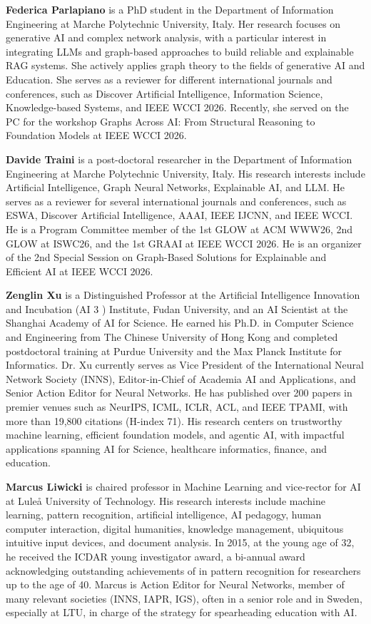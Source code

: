 \documentclass{article}
\begin{document}
\smallskip
\noindent
\textbf{Federica Parlapiano} is a PhD student in the Department of Information Engineering at Marche Polytechnic University, Italy. Her research focuses on generative AI and complex network analysis, with a particular interest in integrating LLMs and graph-based approaches to build reliable and explainable RAG systems. She actively applies graph theory to the fields of generative AI and Education. She serves as a reviewer for different international journals and conferences, such as  Discover Artificial Intelligence, Information Science, Knowledge-based Systems, and IEEE WCCI 2026. Recently, she served on the PC for the workshop Graphs Across AI: From Structural Reasoning to Foundation Models at IEEE WCCI 2026.


\smallskip
\noindent
\textbf{Davide Traini} is a post-doctoral researcher in the Department of Information Engineering at Marche Polytechnic University, Italy. His research interests include Artificial Intelligence, Graph Neural Networks, Explainable AI, and LLM. He serves as a reviewer for several international journals and conferences, such as ESWA, Discover Artificial Intelligence, AAAI, IEEE IJCNN, and IEEE WCCI. He is a Program Committee member of the 1st GLOW at ACM WWW26, 2nd GLOW at ISWC26, and the 1st GRAAI at IEEE WCCI 2026. He is an organizer of the 2nd Special Session on Graph-Based Solutions for Explainable and Efficient AI at IEEE WCCI 2026.

\smallskip
\noindent
\textbf{Zenglin Xu} is a Distinguished Professor at the Artificial Intelligence Innovation and Incubation (AI 
3
 ) Institute, Fudan University, and an AI Scientist at the Shanghai Academy of AI for Science. He earned his Ph.D. in Computer Science and Engineering from The Chinese University of Hong Kong and completed postdoctoral training at Purdue University and the Max Planck Institute for Informatics. Dr. Xu currently serves as Vice President of the International Neural Network Society (INNS), Editor-in-Chief of Academia AI and Applications, and Senior Action Editor for Neural Networks. He has published over 200 papers in premier venues such as NeurIPS, ICML, ICLR, ACL, and IEEE TPAMI, with more than 19,800 citations (H-index 71). His research centers on trustworthy machine learning, efficient foundation models, and agentic AI, with impactful applications spanning AI for Science, healthcare informatics, finance, and education.

 \smallskip
\noindent
\textbf{Marcus Liwicki} is chaired professor in Machine Learning and vice-rector for AI at Luleå University of Technology. His research interests include machine learning, pattern recognition, artificial intelligence, AI pedagogy, human computer interaction, digital humanities, knowledge management, ubiquitous intuitive input devices, and document analysis. In 2015, at the young age of 32, he received the ICDAR young investigator award, a bi-annual award acknowledging outstanding achievements of in pattern recognition for researchers up to the age of 40. Marcus is Action Editor for Neural Networks, member of many relevant societies (INNS, IAPR, IGS), often in a senior role and in Sweden, especially at LTU, in charge of the strategy for spearheading education with AI.
\end{document}
